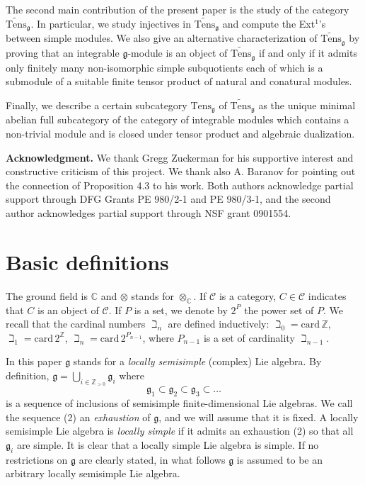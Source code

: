 \documentclass{birkmult}
\newcommand {\ZZ} {\mathbb {Z}}
\newcommand {\CC} {\mathbb {C}}
\newcommand {\card} {\mathrm {card}}
\renewcommand{\gg}{\mathfrak{g}}
\newcommand{\tens}{\mathrm{Tens}}
\newcommand{\lind}{\widetilde{\mathrm{Tens}}}
\begin{document}
The second main contribution of the
present paper is the study of the category $\lind_\gg$. In particular,
we study injectives in $\lind_\gg$ and compute the Ext$^1$'s between
simple modules. We also
give an alternative characterization of $\lind_\gg$ by proving
that an integrable $\gg$-module is an object of $\lind_\gg$
if and only if it admits only finitely
many non-isomorphic simple subquotients each of which is a submodule
of a suitable finite tensor product of natural and conatural modules.

Finally, we describe a certain subcategory $\tens_\gg$ of $\lind_\gg$
as the unique minimal abelian full subcategory of the category of
integrable modules which contains a non-trivial module and is closed
under tensor product and algebraic dualization.

\textbf{Acknowledgment.} We thank Gregg Zuckerman for his
supportive interest and constructive criticism of this project.
We thank also A. Baranov for pointing out the connection of
Proposition 4.3 to his work.
Both authors acknowledge partial support through DFG Grants PE
980/2-1 and PE 980/3-1, and the second author acknowledges partial
support through NSF grant 0901554.

\section{Basic definitions}


\hspace{0.5 cm}The ground field is $\mathbb{C}$ and $\otimes$
stands for $\otimes_\CC$. If $\mathcal C$ is a category, $C\in
\mathcal C$ indicates that $C$ is an object of $\mathcal C$. If
$P$ is a set, we denote by $2^P$ the power set of $P$. We recall
that the cardinal numbers $\beth_n$ are defined inductively:
$\beth_0=\card\,\ZZ$, $\beth_1=\card\,2^\ZZ$,
$\beth_n=\card\,2^{P_{n-1}}$, where $P_{n-1}$ is a set of
cardinality $\beth_{n-1}$.


In this paper $\gg$ stands for a \textit{locally semisimple}
(complex) Lie algebra. By definition,
$\gg=\bigcup_{i\in\mathbb{Z}_{>0}}\gg_i$ where
\begin{equation}\label{eq2}
\gg_1\subset\gg_2\subset\gg_3\subset\dots
\end{equation}
 is a sequence of inclusions of semisimple finite-dimensional Lie
 algebras. We call the sequence (2) an {\it exhaustion} of $\gg$, and we will assume that it is fixed.
 A locally semisimple Lie algebra is \textit{locally simple} if it
 admits an exhaustion (2) so that all $\gg_i$ are simple. It is clear that a locally simple Lie algebra is
 simple. If no restrictions on $\gg$ are clearly stated, in what
 follows $\gg$ is assumed to be an arbitrary locally semisimple
 Lie algebra.
\end{document}
